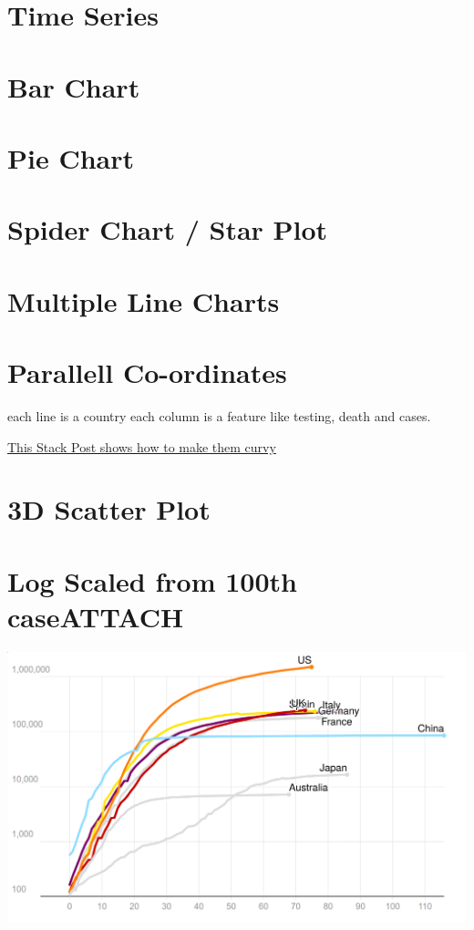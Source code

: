 \documentclass[11pt]{article}
\begin{document}
\section{Time Series}
\label{sec:org416bd07}

\section{Bar Chart}
\label{sec:org21a3513}

\section{Pie Chart}
\label{sec:orgcababeb}

\section{Spider Chart / Star Plot}
\label{sec:orge275014}

\section{Multiple Line Charts}
\label{sec:org782b77f}

\section{Parallell Co-ordinates}
\label{sec:org84f8ded}
each line is a country
each column is a feature like testing, death and cases.

\href{https://stackoverflow.com/a/35206832/10593632}{This Stack Post shows how to make them curvy}

\section{3D Scatter Plot}
\label{sec:org342f127}
\section{Log Scaled from 100th case\hfill{}\textsc{ATTACH}}
\label{sec:org910e724}
\begin{center}
\includegraphics[width=.9\linewidth]{./_20200518_184546screenshot.png}
\end{center}
\end{document}
